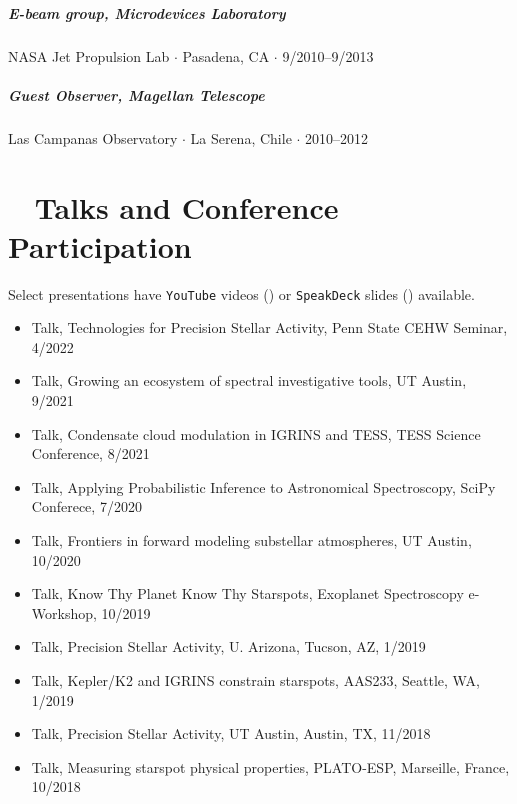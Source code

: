 \documentclass[10pt,letterpaper]{article}
\begin{document}
\subparagraph{E-beam group, Microdevices Laboratory}
NASA Jet Propulsion Lab $\cdot$ Pasadena, CA $\cdot$ 9/2010--9/2013

\subparagraph{Guest Observer, Magellan Telescope}
Las Campanas Observatory $\cdot$ La Serena, Chile $\cdot$ 2010--2012


\section*{\faSlideshare ~ Talks and Conference Participation}

Select presentations have \texttt{YouTube} videos (\faYoutube) or \texttt{SpeakDeck} slides (\faSpeakerDeck) available.

\begin{itemize}


    \item Talk, Technologies for Precision Stellar Activity, Penn State CEHW Seminar, 4/2022
    \item Talk, Growing an ecosystem of spectral investigative tools, UT Austin, 9/2021
    \item Talk, \href{https://youtu.be/0yLgE_8YsIM?t=130}{\faYoutube} Condensate cloud modulation in IGRINS and TESS, TESS Science Conference, 8/2021
    \item Talk, \href{https://youtu.be/ME7kSjPe7mM}{\faYoutube} Applying Probabilistic Inference to Astronomical Spectroscopy, SciPy Conferece, 7/2020
    \item Talk, \href{https://speakerdeck.com/gully/frontiers-in-forward-modeling-substellar-atmospheres}{\faSpeakerDeck} Frontiers in forward modeling substellar atmospheres, UT Austin, 10/2020
    \item Talk, \href{https://speakerdeck.com/gully/know-thy-planet-know-thy-starspots}{\faSpeakerDeck} Know Thy Planet Know Thy Starspots, Exoplanet Spectroscopy e-Workshop, 10/2019
    \item Talk, Precision Stellar Activity, U. Arizona, Tucson, AZ, 1/2019
    \item Talk, \href{https://speakerdeck.com/gully/k2-and-igrins-constrain-starspot-filling-factors-and-temperatures}{\faSpeakerDeck} Kepler/K2 and IGRINS constrain starspots, AAS233, Seattle, WA, 1/2019
    \item Talk, Precision Stellar Activity, UT Austin, Austin, TX, 11/2018
    \item Talk, \href{https://speakerdeck.com/gully/k2-and-high-resolution-near-ir-spectroscopy}{\faSpeakerDeck} Measuring starspot physical properties, PLATO-ESP, Marseille, France, 10/2018

\end{itemize}
\end{document}
